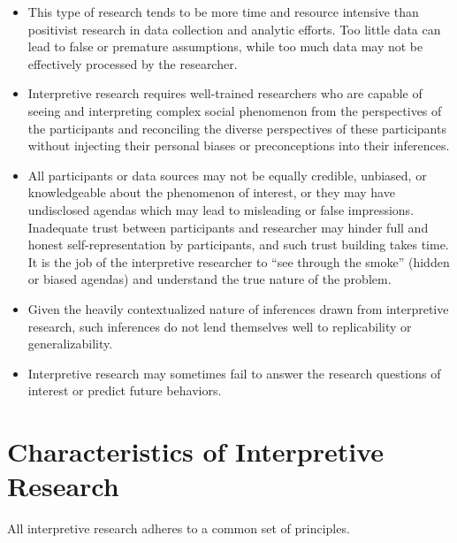 \begin{itemize}

	\item This type of research tends to be more time and resource intensive than positivist research in data collection and analytic efforts. Too little data can lead to false or premature assumptions, while too much data may not be effectively processed by the researcher.

	\item Interpretive research requires well-trained researchers who are capable of seeing and interpreting complex social phenomenon from the perspectives of the participants and reconciling the diverse perspectives of these participants without injecting their personal biases or preconceptions into their inferences.

	\item All participants or data sources may not be equally credible, unbiased, or knowledgeable about the phenomenon of interest, or they may have undisclosed agendas which may lead to misleading or false impressions. Inadequate trust between participants and researcher may hinder full and honest self-representation by participants, and such trust building takes time. It is the job of the interpretive researcher to ``see through the smoke'' (hidden or biased agendas) and understand the true nature of the problem.

	\item Given the heavily contextualized nature of inferences drawn from interpretive research, such inferences do not lend themselves well to replicability or generalizability. 

	\item Interpretive research may sometimes fail to answer the research questions of interest or predict future behaviors.

\end{itemize}
\section{Characteristics of Interpretive Research}

All interpretive research adheres to a common set of principles.

